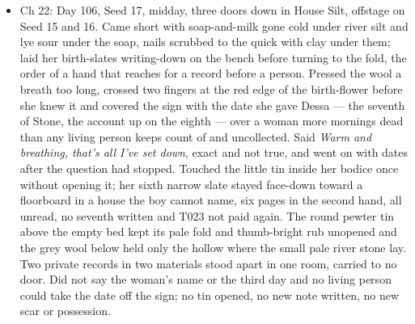 \documentclass{design/chronicle}
\begin{document}
{\begin{itemize}[leftmargin=1.4em,itemsep=1pt,topsep=3pt,parsep=0pt]
\item Ch 22: Day 106, Seed 17, midday, three doors down in House Silt, offstage on Seed 15 and 16. Came short with soap-and-milk gone cold under river silt and lye sour under the soap, nails scrubbed to the quick with clay under them; laid her birth-slates writing-down on the bench before turning to the fold, the order of a hand that reaches for a record before a person. Pressed the wool a breath too long, crossed two fingers at the red edge of the birth-flower before she knew it and covered the sign with the date she gave Dessa --- the seventh of Stone, the account up on the eighth --- over a woman more mornings dead than any living person keeps count of and uncollected. Said \emph{Warm and breathing, that’s all I’ve set down}, exact and not true, and went on with dates after the question had stopped. Touched the little tin inside her bodice once without opening it; her sixth narrow slate stayed face-down toward a floorboard in a house the boy cannot name, six pages in the second hand, all unread, no seventh written and T023 not paid again. The round pewter tin above the empty bed kept its pale fold and thumb-bright rub unopened and the grey wool below held only the hollow where the small pale river stone lay. Two private records in two materials stood apart in one room, carried to no door. Did not say the woman’s name or the third day and no living person could take the date off the sign; no tin opened, no new note written, no new scar or possession.

\end{itemize}

\begin{itemize}[leftmargin=1.4em,itemsep=1pt,topsep=3pt,parsep=0pt]


\end{itemize}}
\end{document}
